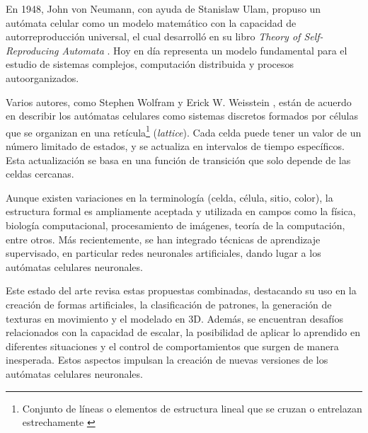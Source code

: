 En 1948, John von Neumann, con ayuda de Stanislaw Ulam, propuso un autómata celular como un modelo matemático con la capacidad de autorreproducción universal, el cual desarrolló en su libro \textit{Theory of Self-Reproducing Automata} \cite{vonNeumann1948}. Hoy en día representa un modelo fundamental para el estudio de sistemas complejos, computación distribuida y procesos autoorganizados. 

Varios autores, como Stephen Wolfram \cite{wolfram1982} y Erick W. Weisstein \cite{weissteinCA}, están de acuerdo en describir los autómatas celulares como sistemas discretos formados por células que se organizan en una retícula\footnote{Conjunto de líneas o elementos de estructura lineal que se cruzan o entrelazan estrechamente \cite{fundacionBBVALattice}} (\textit{lattice}). Cada celda puede tener un valor de un número limitado de estados, y se actualiza en intervalos de tiempo específicos. Esta actualización se basa en una función de transición que solo depende de las celdas cercanas.

Aunque existen variaciones en la terminología (celda, célula, sitio, color), la estructura formal es ampliamente aceptada y utilizada en campos como la física, biología computacional, procesamiento de imágenes, teoría de la computación, entre otros. Más recientemente, se han integrado técnicas de aprendizaje supervisado, en particular redes neuronales artificiales, dando lugar a los autómatas celulares neuronales.

Este estado del arte revisa estas propuestas combinadas, destacando su uso en la creación de formas artificiales, la clasificación de patrones, la generación de texturas en movimiento y el modelado en 3D. Además, se encuentran desafíos relacionados con la capacidad de escalar, la posibilidad de aplicar lo aprendido en diferentes situaciones y el control de comportamientos que surgen de manera inesperada. Estos aspectos impulsan la creación de nuevas versiones de los autómatas celulares neuronales.